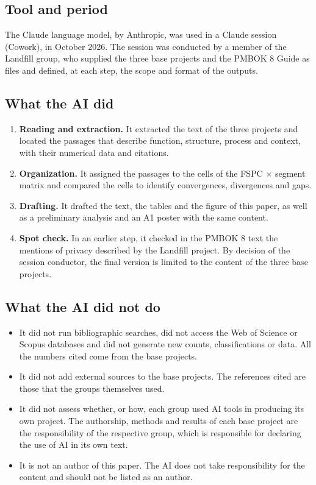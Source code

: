 \documentclass[12pt,a4paper,article,oneside,brazil,english]{abntex2}
\begin{document}
\subsection{Tool and period}

The Claude language model, by Anthropic, was used in a Claude session (Cowork), in October 2026. The session was conducted by a member of the Landfill group, who supplied the three base projects and the PMBOK 8 Guide as files and defined, at each step, the scope and format of the outputs.

\subsection{What the AI did}

\begin{enumerate}
\item \textbf{Reading and extraction.} It extracted the text of the three projects and located the passages that describe function, structure, process and context, with their numerical data and citations.
\item \textbf{Organization.} It assigned the passages to the cells of the FSPC $\times$ segment matrix and compared the cells to identify convergences, divergences and gaps.
\item \textbf{Drafting.} It drafted the text, the tables and the figure of this paper, as well as a preliminary analysis and an A1 poster with the same content.
\item \textbf{Spot check.} In an earlier step, it checked in the PMBOK 8 text the mentions of privacy described by the Landfill project. By decision of the session conductor, the final version is limited to the content of the three base projects.
\end{enumerate}

\subsection{What the AI did not do}

\begin{itemize}
\item It did not run bibliographic searches, did not access the Web of Science or Scopus databases and did not generate new counts, classifications or data. All the numbers cited come from the base projects.
\item It did not add external sources to the base projects. The references cited are those that the groups themselves used.
\item It did not assess whether, or how, each group used AI tools in producing its own project. The authorship, methods and results of each base project are the responsibility of the respective group, which is responsible for declaring the use of AI in its own text.
\item It is not an author of this paper. The AI does not take responsibility for the content and should not be listed as an author.
\end{itemize}
\end{document}
